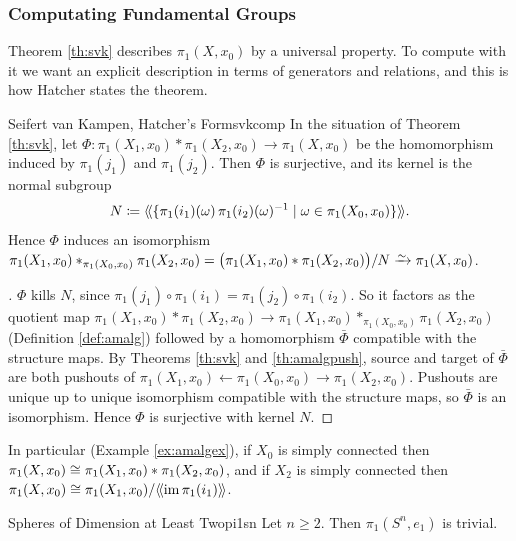 \newpage

\subsubsection{Computating Fundamental Groups}

Theorem \ref{th:svk} describes $\pi_1(X,x_0)$ by a universal property. To compute with it we want an explicit description in terms of generators and relations, and this is how Hatcher states the theorem.

\begin{corollary}{Seifert van Kampen, Hatcher's Form}{svkcomp}
  In the situation of Theorem \ref{th:svk}, let $
    \Phi:\pi_1(X_1,x_0)\ast\pi_1(X_2,x_0)\to\pi_1(X,x_0)
  $
  be the homomorphism induced by $\pi_1(j_1)$ and $\pi_1(j_2)$. Then $\Phi$ is surjective, and its kernel is the normal subgroup \[
    N\coloneq\langle\!\langle \{\pi_1(i_1)(\omega)\,\pi_1(i_2)(\omega)^{-1}\mid\omega\in\pi_1(X_0,x_0)\}\rangle\!\rangle.
  \]
  Hence $\Phi$ induces an isomorphism $\pi_1(X_1,x_0)\ast_{\pi_1(X_0,x_0)}\pi_1(X_2,x_0)=\big(\pi_1(X_1,x_0)\ast\pi_1(X_2,x_0)\big)/N\isoto\pi_1(X,x_0)$.
\end{corollary}

\begin{proof}[]
  $\Phi$ kills $N$, since $\pi_1(j_1)\circ\pi_1(i_1)=\pi_1(j_2)\circ\pi_1(i_2)$. So it factors as the quotient map $\pi_1(X_1,x_0)\ast\pi_1(X_2,x_0)\to\pi_1(X_1,x_0)\ast_{\pi_1(X_0,x_0)}\pi_1(X_2,x_0)$ (Definition \ref{def:amalg}) followed by a homomorphism $\bar\Phi$ compatible with the structure maps. By Theorems \ref{th:svk} and \ref{th:amalgpush}, source and target of $\bar\Phi$ are both pushouts of $\pi_1(X_1,x_0)\leftarrow\pi_1(X_0,x_0)\to\pi_1(X_2,x_0)$. Pushouts are unique up to unique isomorphism compatible with the structure maps, so $\bar\Phi$ is an isomorphism. Hence $\Phi$ is surjective with kernel $N$.
\end{proof}

In particular (Example \ref{ex:amalgex}), if $X_0$ is simply connected then $\pi_1(X,x_0)\cong\pi_1(X_1,x_0)\ast\pi_1(X_2,x_0)$, and if $X_2$ is simply connected then $\pi_1(X,x_0)\cong\pi_1(X_1,x_0)/\langle\!\langle \operatorname{im}\pi_1(i_1)\rangle\!\rangle$.

\begin{example}{Spheres of Dimension at Least Two}{pi1sn}
  Let $n\geq2$. Then $\pi_1(S^n,e_1)$ is trivial.
\end{example}

